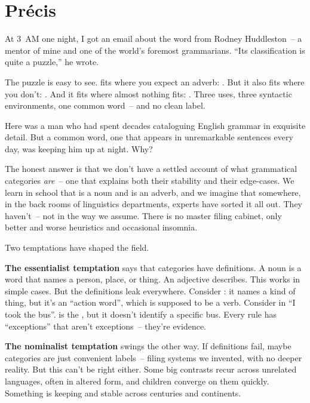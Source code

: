 
\chapter*{Précis}

At 3~AM one night, I got an email about the word  from Rodney Huddleston~-- a mentor of mine and one of the world's foremost grammarians. \enquote{Its classification is quite a puzzle,} he wrote.

The puzzle is easy to see.  fits where you expect an adverb: . But it also fits where you don't: . And it fits where almost nothing fits: . Three uses, three syntactic environments, one common word~-- and no clean label.

Here was a man who had spent decades cataloguing English grammar in exquisite detail. But a common word, one that appears in unremarkable sentences every day, was keeping him up at night. Why?

The honest answer is that we don't have a settled account of what grammatical categories \emph{are}~-- one that explains both their stability and their edge-cases. We learn in school that  is a noun and  is an adverb, and we imagine that somewhere, in the back rooms of linguistics departments, experts have sorted it all out. They haven't~-- not in the way we assume. There is no master filing cabinet, only better and worse heuristics and occasional insomnia.

Two temptations have shaped the field.

\textbf{The essentialist temptation} says that categories have definitions. A noun is a word that names a person, place, or thing. An adjective describes. This works in simple cases. But the definitions leak everywhere. Consider : it names a kind of thing, but it's an \enquote{action word}, which is supposed to be a verb. Consider  in \enquote{I took the bus}.  is the , but it doesn't identify a specific bus. Every rule has \enquote{exceptions} that aren't exceptions~-- they're evidence.

\textbf{The nominalist temptation} swings the other way. If definitions fail, maybe categories are just convenient labels~-- filing systems we invented, with no deeper reality. But this can't be right either. Some big contrasts recur across unrelated languages, often in altered form, and children converge on them quickly. Something is keeping  and  stable across centuries and continents.

